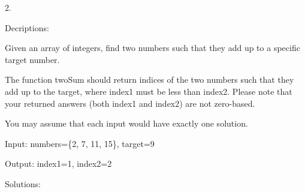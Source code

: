 2.

Decriptions:

	Given an array of integers, find two numbers such that they add up to a specific target number.

The function twoSum should return indices of the two numbers such that they add up to the target, where index1 must be less than index2. Please note that your returned answers (both index1 and index2) are not zero-based.

You may assume that each input would have exactly one solution.

Input: numbers=\{2, 7, 11, 15\}, target=9

Output: index1=1, index2=2

Solutions:


